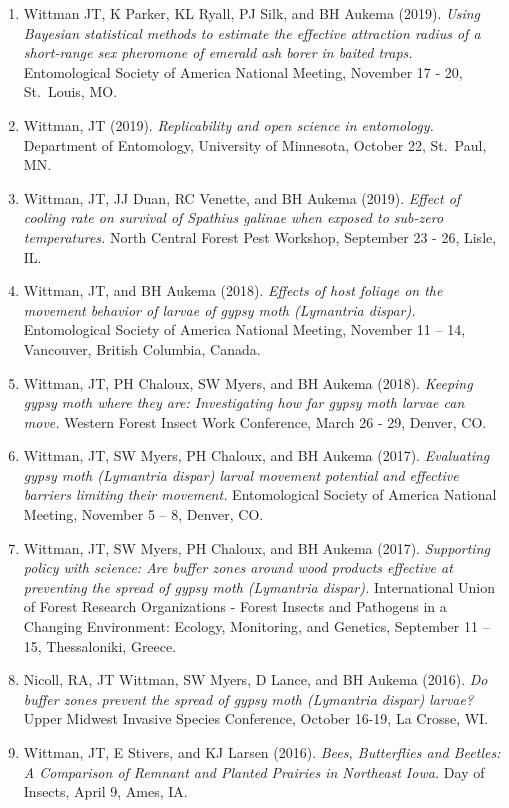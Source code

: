 \documentclass[11pt, a4paper]{awesome-cv}
\providecommand{\tightlist}{%
	\setlength{\itemsep}{0pt}\setlength{\parskip}{0pt}}
\begin{document}
\begin{enumerate}
\def\labelenumi{\arabic{enumi}.}
\tightlist
\item
  Wittman JT, K Parker, KL Ryall, PJ Silk, and BH Aukema (2019). \emph{Using Bayesian statistical methods to estimate the effective attraction radius of a short-range sex pheromone of emerald ash borer in baited traps.} Entomological Society of America National Meeting, November 17 - 20, St.~Louis, MO.
\item
  Wittman, JT (2019). \emph{Replicability and open science in entomology.} Department of Entomology, University of Minnesota, October 22, St.~Paul, MN.
\item
  Wittman, JT, JJ Duan, RC Venette, and BH Aukema (2019). \emph{Effect of cooling rate on survival of Spathius galinae when exposed to sub-zero temperatures.} North Central Forest Pest Workshop, September 23 - 26, Lisle, IL.
\item
  Wittman, JT, and BH Aukema (2018). \emph{Effects of host foliage on the movement behavior of larvae of gypsy moth (Lymantria dispar).} Entomological Society of America National Meeting, November 11 -- 14, Vancouver, British Columbia, Canada.
\item
  Wittman, JT, PH Chaloux, SW Myers, and BH Aukema (2018). \emph{Keeping gypsy moth where they are: Investigating how far gypsy moth larvae can move.} Western Forest Insect Work Conference, March 26 - 29, Denver, CO.
\item
  Wittman, JT, SW Myers, PH Chaloux, and BH Aukema (2017). \emph{Evaluating gypsy moth (Lymantria dispar) larval movement potential and effective barriers limiting their movement.} Entomological Society of America National Meeting, November 5 -- 8, Denver, CO.
\item
  Wittman, JT, SW Myers, PH Chaloux, and BH Aukema (2017). \emph{Supporting policy with science: Are buffer zones around wood products effective at preventing the spread of gypsy moth (Lymantria dispar).} International Union of Forest Research Organizations - Forest Insects and Pathogens in a Changing Environment: Ecology, Monitoring, and Genetics, September 11 -- 15, Thessaloniki, Greece.
\item
  Nicoll, RA, JT Wittman, SW Myers, D Lance, and BH Aukema (2016). \emph{Do buffer zones prevent the spread of gypsy moth (\emph{Lymantria dispar}) larvae?} Upper Midwest Invasive Species Conference, October 16-19, La Crosse, WI.
\item
  Wittman, JT, E Stivers, and KJ Larsen (2016). \emph{Bees, Butterflies and Beetles: A Comparison of Remnant and Planted Prairies in Northeast Iowa.} Day of Insects, April 9, Ames, IA.
\end{enumerate}
\end{document}
